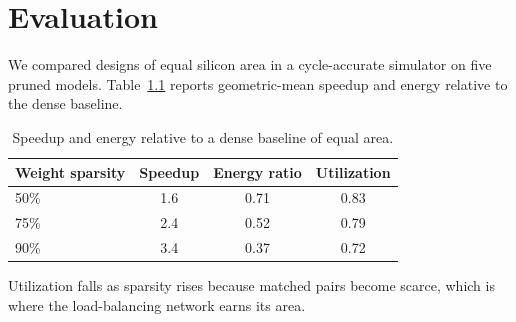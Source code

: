 \chapter{Evaluation}
\label{ch:evaluation}

We compared designs of equal silicon area in a cycle-accurate simulator on five pruned models.
Table~\ref{tab:speedup} reports geometric-mean speedup and energy relative to the dense
baseline.

\begin{table}[htbp]
  \centering
  \caption{Speedup and energy relative to a dense baseline of equal area.}
  \label{tab:speedup}
  \begin{tabular}{lccc}
    \toprule
    Weight sparsity & Speedup & Energy ratio & Utilization \\
    \midrule
    50\% & 1.6 & 0.71 & 0.83 \\
    75\% & 2.4 & 0.52 & 0.79 \\
    90\% & 3.4 & 0.37 & 0.72 \\
    \bottomrule
  \end{tabular}
\end{table}

Utilization falls as sparsity rises because matched pairs become scarce, which is where the
load-balancing network earns its area.
